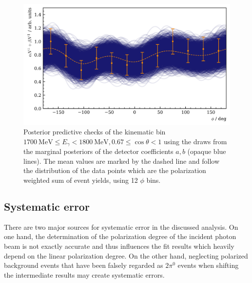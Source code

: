 \begin{figure}[htbp]
	\centering
	\includegraphics[width=\linewidth]{../bayes/etap_event_based_fit/plots/eff_PPC.png}
	\caption{Posterior predictive checks of the kinematic bin $\SI{1700}{\mega\eV}\leq E_\gamma<\SI{1800}{\mega\eV}, 0.67\leq\cos\theta<1$ using the draws from the marginal posteriors of the detector coefficients $a,b$ (opaque blue lines). The mean values are marked by the dashed line and follow the distribution of the data points which are the polarization weighted sum of event yields, using 12 $\phi$ bins.}	
	\label{fig:etap_eff}
\end{figure}
\subsection{Systematic error}
\label{subsec:sys}
There are two major sources for systematic error in the discussed analysis. On one hand, the determination of the polarization degree of the incident photon beam is not exactly accurate and thus influences the fit results which heavily depend on the linear polarization degree. On the other hand, neglecting polarized background events that have been falsely regarded as $2\pi^0$ events when shifting the intermediate results may create systematic errors. 

